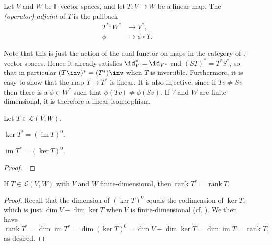 \documentclass[article, a4paper, 11pt, oneside]{memoir}
\numberwithin{equation}{chapter}
\newcommand{\calL}{\mathcal{L}}
\newcommand{\field}{\mathbb{F}}
\begin{document}
\begin{definition}
    Let $V$ and $W$ be $\field$-vector spaces, and let $T \colon V \to W$ be a linear map. The \emph{(operator) adjoint} of $T$ is the pullback
    \begin{align*}
        T^* \colon W^* &\to V^*, \\
        \phi &\mapsto \phi \circ T.
    \end{align*}
\end{definition}
%
Note that this is just the action of the dual functor on maps in the category of $\field$-vector spaces. Hence it already satisfies $\id_V^* = \id_{V^*}$ and $(ST)^* = T^* S^*$, so that in particular $(T\inv)^* = (T^*)\inv$ when $T$ is invertible. Furthermore, it is easy to show that the map $T \mapsto T^*$ is linear. It is also injective, since if $Tv \neq Sv$ then there is a $\phi \in W^*$ such that $\phi(Tv) \neq \phi(Sv)$. If $V$ and $W$ are finite-dimensional, it is therefore a linear isomorphism.

\newcommand{\im}{\operatorname{im}}

\begin{proposition}
    Let $T \in \calL(V,W)$.
    \begin{enumprop}
        \item $\ker T^* = (\im T)^0$.
        \item $\im T^* = (\ker T)^0$.
    \end{enumprop}
\end{proposition}

\begin{proof}
    \textcite[Theorem~3.19]{romanlinalg}.
\end{proof}

\newcommand{\rank}{\operatorname{rank}}

\begin{corollary}
    \label{cor:adjoint-rank}
    If $T \in \calL(V,W)$ with $V$ and $W$ finite-dimensional, then $\rank T^* = \rank T$.
\end{corollary}

\begin{proof}
    Recall that the dimension of $(\ker T)^0$ equals the codimension of $\ker T$, which is just $\dim V - \dim \ker T$ when $V$ is finite-dimensional (cf. \cite[Theorem~3.15]{romanlinalg}). We then have
    \begin{equation*}
        \rank T^*
            = \dim \im T^*
            = \dim (\ker T)^0
            = \dim V - \dim \ker T
            = \dim \im T
            = \rank T,
    \end{equation*}
    as desired.
\end{proof}
\end{document}
